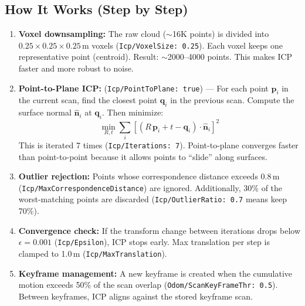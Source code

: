 \documentclass[11pt,a4paper]{article}
\begin{document}
\subsection{How It Works (Step by Step)}

\begin{enumerate}[itemsep=4pt]
  \item \textbf{Voxel downsampling:} The raw cloud ($\sim$16K points) is
        divided into $0.25 \times 0.25 \times 0.25$\,m voxels
        (\texttt{Icp/VoxelSize: 0.25}). Each voxel keeps one representative
        point (centroid). Result: $\sim$2000--4000 points. This makes ICP
        faster and more robust to noise.

  \item \textbf{Point-to-Plane ICP:}
        (\texttt{Icp/PointToPlane: true}) --- For each point $\mathbf{p}_i$ in
        the current scan, find the closest point $\mathbf{q}_i$ in the previous
        scan. Compute the surface normal $\hat{\mathbf{n}}_i$ at $\mathbf{q}_i$.
        Then minimize:
        \begin{equation}
          \min_{R, t} \sum_i \left[ (R\,\mathbf{p}_i + t - \mathbf{q}_i) \cdot \hat{\mathbf{n}}_i \right]^2
        \end{equation}
        This is iterated 7 times (\texttt{Icp/Iterations: 7}). Point-to-plane
        converges faster than point-to-point because it allows points to
        ``slide'' along surfaces.

  \item \textbf{Outlier rejection:} Points whose correspondence distance
        exceeds 0.8\,m (\texttt{Icp/MaxCorrespondenceDistance}) are ignored.
        Additionally, 30\% of the worst-matching points are discarded
        (\texttt{Icp/OutlierRatio: 0.7} means keep 70\%).

  \item \textbf{Convergence check:} If the transform change between
        iterations drops below $\epsilon = 0.001$
        (\texttt{Icp/Epsilon}), ICP stops early. Max translation per
        step is clamped to 1.0\,m (\texttt{Icp/MaxTranslation}).

  \item \textbf{Keyframe management:} A new keyframe is created when the
        cumulative motion exceeds 50\% of the scan overlap
        (\texttt{Odom/ScanKeyFrameThr: 0.5}). Between keyframes, ICP
        aligns against the stored keyframe scan.
\end{enumerate}
\end{document}

